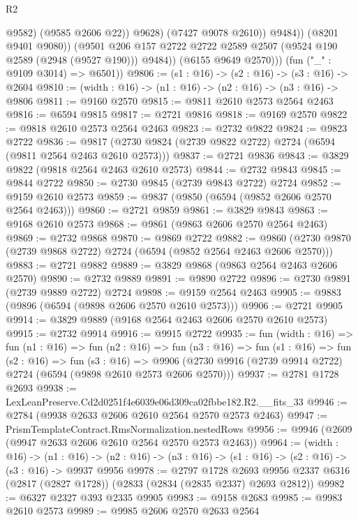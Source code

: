 \begin{lexlean}{R2}
\begin{coremodule}
                          @9582)
                        (@9585 @2606 @22))
                      @9628)
                    (@7427 @9078 @2610))
                  @9484))
              (@8201 @9401 @9080))
            (@9501 @206 @157 @2722 @2722 @2589 @2507 (@9524 @190 @2589 (@2948 (@9527 @190))) @9484))
          (@6155 @9649 @2570)))
      (fun ("_" : @9109 @3014) => @6501))
@9806 := (s1 : @16) -> (s2 : @16) -> (s3 : @16) -> @2604
@9810 := (width : @16) -> (n1 : @16) -> (n2 : @16) -> (n3 : @16) -> @9806
@9811 := @9160 @2570
@9815 := @9811 @2610 @2573 @2564 @2463
@9816 := @6594 @9815
@9817 := @2721 @9816
@9818 := @9169 @2570
@9822 := @9818 @2610 @2573 @2564 @2463
@9823 := @2732 @9822
@9824 := @9823 @2722
@9836 := @9817 (@2730 @9824 (@2739 @9822 @2722) @2724 (@6594 (@9811 @2564 @2463 @2610 @2573)))
@9837 := @2721 @9836
@9843 := @3829 @9822 (@9818 @2564 @2463 @2610 @2573)
@9844 := @2732 @9843
@9845 := @9844 @2722
@9850 := @2730 @9845 (@2739 @9843 @2722) @2724
@9852 := @9159 @2610 @2573
@9859 := @9837 (@9850 (@6594 (@9852 @2606 @2570 @2564 @2463)))
@9860 := @2721 @9859
@9861 := @3829 @9843
@9863 := @9168 @2610 @2573
@9868 := @9861 (@9863 @2606 @2570 @2564 @2463)
@9869 := @2732 @9868
@9870 := @9869 @2722
@9882 := @9860 (@2730 @9870 (@2739 @9868 @2722) @2724 (@6594 (@9852 @2564 @2463 @2606 @2570)))
@9883 := @2721 @9882
@9889 := @3829 @9868 (@9863 @2564 @2463 @2606 @2570)
@9890 := @2732 @9889
@9891 := @9890 @2722
@9896 := @2730 @9891 (@2739 @9889 @2722) @2724
@9898 := @9159 @2564 @2463
@9905 := @9883 (@9896 (@6594 (@9898 @2606 @2570 @2610 @2573)))
@9906 := @2721 @9905
@9914 := @3829 @9889 (@9168 @2564 @2463 @2606 @2570 @2610 @2573)
@9915 := @2732 @9914
@9916 := @9915 @2722
@9935 := fun (width : @16) =>
  fun (n1 : @16) =>
  fun (n2 : @16) =>
  fun (n3 : @16) =>
  fun (s1 : @16) =>
  fun (s2 : @16) =>
  fun (s3 : @16) =>
  @9906 (@2730 @9916 (@2739 @9914 @2722) @2724 (@6594 (@9898 @2610 @2573 @2606 @2570)))
@9937 := @2781 @1728 @2693
@9938 := LexLeanPreserve.Cd2d0251f4e6039e06d309ca02fbbe182.R2.__fits_33
@9946 := @2784 (@9938 @2633 @2606 @2610 @2564 @2570 @2573 @2463)
@9947 := PrismTemplateContract.RmsNormalization.nestedRows
@9956 := @9946 (@2609 (@9947 @2633 @2606 @2610 @2564 @2570 @2573 @2463))
@9964 := (width : @16) ->
  (n1 : @16) -> (n2 : @16) -> (n3 : @16) -> (s1 : @16) -> (s2 : @16) -> (s3 : @16) -> @9937 @9956
@9978 := @2797
    @1728
    @2693
    @9956
    @2337
    @6316
    (@2817 (@2827 @1728))
    (@2833 (@2834 (@2835 @2337) @2693 @2812))
@9982 := @6327 @2327 @393 @2335 @9905
@9983 := @9158 @2683
@9985 := @9983 @2610 @2573
@9989 := @9985 @2606 @2570 @2633 @2564

\end{coremodule}
\end{lexlean}
